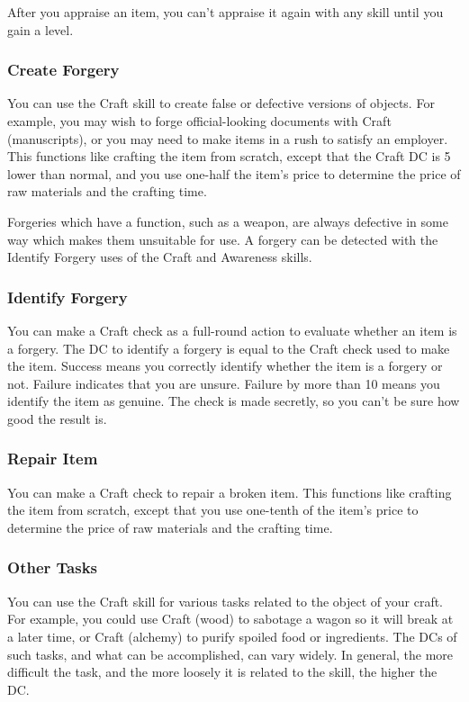 After you appraise an item, you can't appraise it again with any skill until you gain a level.

\subsubsection{Create Forgery}
You can use the Craft skill to create false or defective versions of objects. For example, you may wish to forge official-looking documents with Craft (manuscripts), or you may need to make items in a rush to satisfy an employer. This functions like crafting the item from scratch, except that the Craft DC is 5 lower than normal, and you use one-half the item's price to determine the price of raw materials and the crafting time.

Forgeries which have a function, such as a weapon, are always defective in some way which makes them unsuitable for use. A forgery can be detected with the Identify Forgery uses of the Craft and Awareness skills.

\subsubsection{Identify Forgery}
You can make a Craft check as a full-round action to evaluate whether an item is a forgery. The DC to identify a forgery is equal to the Craft check used to make the item. Success means you correctly identify whether the item is a forgery or not. Failure indicates that you are unsure. Failure by more than 10 means you identify the item as genuine. The check is made secretly, so you can't be sure how good the result is.

\subsubsection{Repair Item}
You can make a Craft check to repair a broken item. This functions like crafting the item from scratch, except that you use one-tenth of the item's price to determine the price of raw materials and the crafting time.

\subsubsection{Other Tasks}
You can use the Craft skill for various tasks related to the object of your craft. For example, you could use Craft (wood) to sabotage a wagon so it will break at a later time, or Craft (alchemy) to purify spoiled food or ingredients. The DCs of such tasks, and what can be accomplished, can vary widely. In general, the more difficult the task, and the more loosely it is related to the skill, the higher the DC.

